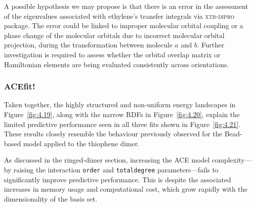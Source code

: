 A possible hypothesis we may propose is that there is an error in the assessment of the eigenvalues associated with ethylene's transfer integrals via \textsc{xtb-dipro} package.
The error could be linked to improper molecular orbital coupling or a phase change of the molecular orbitals due to incorrect molecular orbital projection, during the transformation between molecule $a$ and $b$.
Further investigation is required to assess whether the orbital overlap matrix or Hamiltonian elements are being evaluated consistently across orientations.

\subsubsection{ACEfit!}
Taken together, the highly structured and non-uniform energy landscapes in Figure~\ref{fig:4.19}, along with the narrow RDFs in Figure~\ref{fig:4.20}, explain the limited predictive performance seen in all three fits shown in Figure~\ref{fig:4.21}. These results closely resemble the behaviour previously observed for the Bead-based model applied to the thiophene dimer.

As discussed in the ringed-dimer section, increasing the ACE model complexity—by raising the interaction \texttt{order} and \texttt{totaldegree} parameters—fails to significantly improve predictive performance. This is despite the associated increases in memory usage and computational cost, which grow rapidly with the dimensionality of the basis set.

